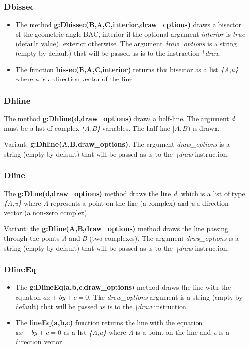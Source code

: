 \subsubsection{Dbissec}
\begin{itemize}
    \item The method \textbf{g:Dbissec(B,A,C,interior,draw\_options)} draws a bisector of the geometric angle BAC, interior if the optional argument \emph{interior} is \emph{true} (default value), exterior otherwise. The argument \emph{draw\_options} is a string (empty by default) that will be passed as is to the instruction
\emph{\textbackslash draw}.
    \item The function \textbf{bissec(B,A,C,interior)} returns this bisector as a list \emph{\{A,u\}} where \emph{u} is a direction vector of the line. \end{itemize}

\subsubsection{Dhline}
The method \textbf{g:Dhline(d,draw\_options)} draws a half-line. The argument \emph{d} must be a list of complex \emph{\{A,B\}} variables. The half-line $[A,B)$ is drawn.

Variant: \textbf{g:Dhline(A,B,draw\_options)}. The argument \emph{draw\_options} is a string (empty by default) that will be passed as is to the \emph{\textbackslash draw} instruction.

\subsubsection{Dline}
The \textbf{g:Dline(d,draw\_options)} method draws the line \emph{d}, which is a list of type \emph{\{A,u\}} where \emph{A} represents a point on the line (a complex) and \emph{u} a direction vector (a non-zero complex).

Variant: the \textbf{g:Dline(A,B,draw\_options)} method draws the line passing through the points \emph{A} and \emph{B} (two complexes). The argument \emph{draw\_options} is a string (empty by default) that will be passed as is to the \emph{\textbackslash draw} instruction.

\subsubsection{DlineEq}
\begin{itemize}
    \item The \textbf{g:DlineEq(a,b,c,draw\_options)} method draws the line with the equation \(ax+by+c=0\). The \emph{draw\_options} argument is a string (empty by default) that will be passed as is to the \emph{\textbackslash draw} instruction.
    \item The \textbf{lineEq(a,b,c)} function returns the line with the equation \(ax+by+c=0\) as a list \emph{\{A,u\}} where \emph{A} is a point on the line and \emph{u} is a direction vector. \end{itemize}

